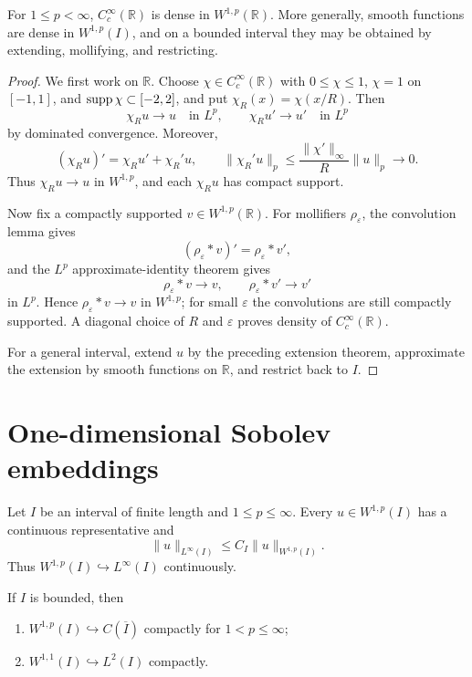 \begin{notetheorem}
For $1\le p<\infty$, $C_c^\infty(\mathbb R)$ is dense in
$W^{1,p}(\mathbb R)$.  More generally, smooth functions are dense in
$W^{1,p}(I)$, and on a bounded interval they may be obtained by extending,
mollifying, and restricting.
\end{notetheorem}

\begin{proof}
We first work on $\mathbb R$.  Choose $\chi\in C_c^\infty(\mathbb R)$ with
$0\le\chi\le1$, $\chi=1$ on $[-1,1]$, and $\operatorname{supp}\chi\subset[-2,2]$, and put
$\chi_R(x)=\chi(x/R)$.  Then
\[
  \chi_Ru\longrightarrow u
  \quad\text{in }L^p,
  \qquad
  \chi_Ru'\longrightarrow u'
  \quad\text{in }L^p
\]
by dominated convergence.  Moreover,
\[
  (\chi_Ru)'=\chi_Ru'+\chi_R'u,
  \qquad
  \|\chi_R'u\|_p\le\frac{\|\chi'\|_\infty}{R}\|u\|_p\longrightarrow0.
\]
Thus $\chi_Ru\to u$ in $W^{1,p}$, and each $\chi_Ru$ has compact support.

Now fix a compactly supported $v\in W^{1,p}(\mathbb R)$.  For mollifiers
$\rho_\varepsilon$, the convolution lemma gives
\[
  (\rho_\varepsilon*v)'=\rho_\varepsilon*v',
\]
and the $L^p$ approximate-identity theorem gives
\[
  \rho_\varepsilon*v\to v,
  \qquad
  \rho_\varepsilon*v'\to v'
\]
in $L^p$.  Hence $\rho_\varepsilon*v\to v$ in $W^{1,p}$; for small
$\varepsilon$ the convolutions are still compactly supported.  A diagonal
choice of $R$ and $\varepsilon$ proves density of $C_c^\infty(\mathbb R)$.

For a general interval, extend $u$ by the preceding extension theorem,
approximate the extension by smooth functions on $\mathbb R$, and restrict
back to $I$.
\end{proof}

\section{One-dimensional Sobolev embeddings}

\begin{notetheorem}
Let $I$ be an interval of finite length and $1\le p\le\infty$.  Every
$u\in W^{1,p}(I)$ has a continuous representative and
\[
  \|u\|_{L^\infty(I)}
  \le C_I\|u\|_{W^{1,p}(I)}.
\]
Thus $W^{1,p}(I)\hookrightarrow L^\infty(I)$ continuously.

If $I$ is bounded, then
\begin{enumerate}
  \item $W^{1,p}(I)\hookrightarrow C(\overline I)$ compactly for
        $1<p\le\infty$;
  \item $W^{1,1}(I)\hookrightarrow L^2(I)$ compactly.
\end{enumerate}
\end{notetheorem}

